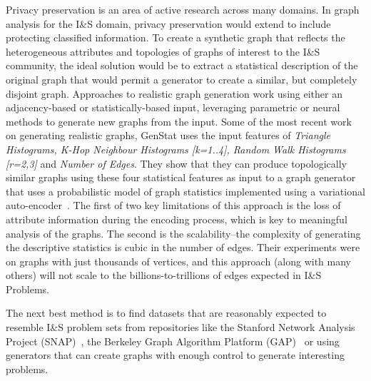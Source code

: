 Privacy preservation is an area of active research across many domains.
In graph analysis for the I\&S domain, privacy preservation would extend to include protecting classified information. 
To create a synthetic graph that reflects the heterogeneous attributes and topologies of graphs of interest to the I\&S community, the ideal solution would be to extract a statistical description of the original graph that would permit a generator to create a similar, but completely disjoint graph. 
Approaches to realistic graph generation work using either an adjacency-based or statistically-based input, leveraging parametric or neural methods to generate new graphs from the input.
Some of the most recent work on generating realistic graphs, GenStat uses the input features of \textit{Triangle Histograms, K-Hop Neighbour Histograms [k=1..4], Random Walk Histograms [r=2,3]} and \textit{Number of Edges}.
They show that they can produce topologically similar graphs using these four statistical features as input to a graph generator that uses a probabilistic model of graph statistics implemented using a variational auto-encoder~\cite{Zahirnia2024}.
The first of two key limitations of this approach is the loss of attribute information during the encoding process, which is key to meaningful analysis of the graphs. 
The second is the scalability--the complexity of generating the descriptive statistics is cubic in the number of edges.
Their experiments were on graphs with just thousands of vertices, and this approach (along with many others) will not scale to the billions-to-trillions of edges expected in I\&S Problems.

The next best method is to find datasets that are reasonably expected to resemble I\&S problem sets from repositories like the Stanford Network Analysis Project (SNAP)~\cite{Leskovec2014}, the Berkeley Graph Algorithm Platform (GAP)~\cite{Beamer2017} or using generators that can create graphs with enough control to generate interesting problems. 






